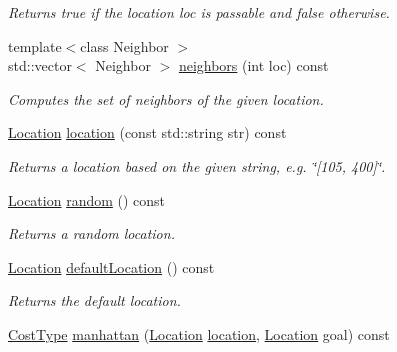 \begin{DoxyCompactItemize}
\begin{DoxyCompactList}\small\item\em Returns {\ttfamily true} if the location {\ttfamily loc} is passable and {\ttfamily false} otherwise. \end{DoxyCompactList}\item 
{\footnotesize template$<$class Neighbor $>$ }\\std\+::vector$<$ Neighbor $>$ \hyperlink{structslb_1_1core_1_1sb_1_1GridMap_a278fdbb3d1d8e394f4c180ff5b011f34}{neighbors} (int loc) const 
\begin{DoxyCompactList}\small\item\em Computes the set of neighbors of the given location. \end{DoxyCompactList}\item 
\hyperlink{structslb_1_1core_1_1sb_1_1GridMap_ad7f78dfb03ac219e9f9047c17996d9f5}{Location} \hyperlink{structslb_1_1core_1_1sb_1_1GridMap_a6887d7a53491a61b67fe9f17007a71d4}{location} (const std\+::string str) const 
\begin{DoxyCompactList}\small\item\em Returns a location based on the given string, e.\+g. \char`\"{}\mbox{[}105, 400\mbox{]}\char`\"{}. \end{DoxyCompactList}\item 
\hyperlink{structslb_1_1core_1_1sb_1_1GridMap_ad7f78dfb03ac219e9f9047c17996d9f5}{Location} \hyperlink{structslb_1_1core_1_1sb_1_1GridMap_a2c7b8171037751b9a12a185d7bc55123}{random} () const 
\begin{DoxyCompactList}\small\item\em Returns a random location. \end{DoxyCompactList}\item 
\hyperlink{structslb_1_1core_1_1sb_1_1GridMap_ad7f78dfb03ac219e9f9047c17996d9f5}{Location} \hyperlink{structslb_1_1core_1_1sb_1_1GridMap_a5d504373b0edd401eed70460e81a8965}{default\+Location} () const 
\begin{DoxyCompactList}\small\item\em Returns the default location. \end{DoxyCompactList}\item 
\hyperlink{structslb_1_1core_1_1sb_1_1GridMap_a7e34c6c6b867bb15e2062f5c9ae3458c}{Cost\+Type} \hyperlink{structslb_1_1core_1_1sb_1_1GridMap_adcf846e0ae2d5fe0bfad3e69662374ed}{manhattan} (\hyperlink{structslb_1_1core_1_1sb_1_1GridMap_ad7f78dfb03ac219e9f9047c17996d9f5}{Location} \hyperlink{structslb_1_1core_1_1sb_1_1GridMap_aff0cbd3845da8e84f6f65c82285af135}{location}, \hyperlink{structslb_1_1core_1_1sb_1_1GridMap_ad7f78dfb03ac219e9f9047c17996d9f5}{Location} goal) const 

\end{DoxyCompactItemize}
